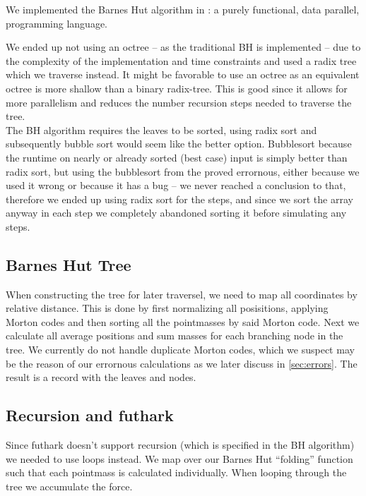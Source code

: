 We implemented the Barnes Hut algorithm in
: a purely functional,
data parallel, programming language.

We ended up not using an octree -- as the traditional BH is implemented -- due
to the complexity of the implementation and time constraints and used a radix
tree which we traverse instead. It might be favorable to use an octree as an
equivalent octree is more shallow than a binary radix-tree. This is good since
it allows for more parallelism and reduces the number recursion steps needed to
traverse the tree.\\

\noindent
The BH algorithm requires the leaves to be sorted, using radix sort and
subsequently bubble sort would seem like the better option. Bubblesort because
the runtime on nearly or already sorted (best case) input is simply better than
radix sort, but using the bubblesort from the
proved errornous, either because we used it wrong or because it has a bug -- we
never reached a conclusion to that, therefore we ended up using radix sort for
the steps, and since we sort the array anyway in each step we completely
abandoned sorting it before simulating any steps.

\subsection{Barnes Hut Tree}
When constructing the tree for later traversel, we need to map all coordinates
by relative distance. This is done by first normalizing all posisitions,
applying Morton codes and then sorting all the pointmasses by said Morton code.
Next we calculate all average positions and sum masses for each branching node
in the tree. We currently do not handle duplicate Morton codes, which we suspect
may be the reason of our errornous calculations as we later discuss in
\autoref{sec:errors}. The result is a record with the leaves and nodes.

\subsection{Recursion and futhark}
Since futhark doesn't support recursion (which is specified in the BH algorithm)
we needed to use loops instead. We map over our Barnes Hut ``folding'' function
such that each pointmass is calculated individually. When looping through the
tree we accumulate the force.

